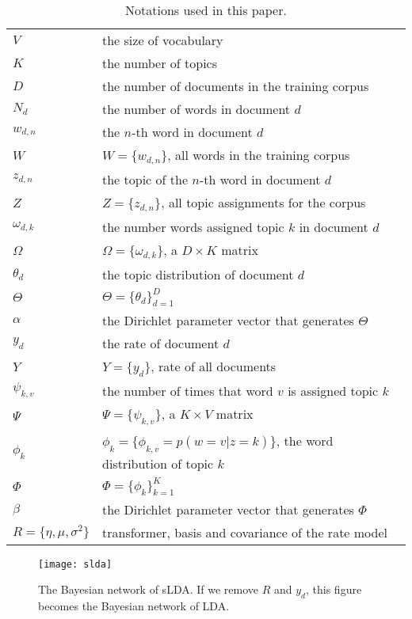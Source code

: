 \begin{table}[!h]
  \centering
  \begin{tabular}{ll}
    $V$ & the size of vocabulary \\
    $K$ & the number of topics \\
    $D$ & the number of documents in the training corpus \\
    $N_d$ & the number of words in document $d$ \\
    $w_{d,n}$ & the $n$-th word in document $d$ \\
    $W$ & $W=\{w_{d,n}\}$, all words in the training corpus \\
    $z_{d,n}$ & the topic of the $n$-th word in document $d$ \\
    $Z$ & $Z=\{z_{d,n}\}$, all topic assignments for the corpus \\
    $\omega_{d,k}$ & the number words assigned topic $k$ in document $d$ \\
    $\Omega$ & $\Omega=\{\omega_{d,k}\}$, a $D\times{}K$ matrix \\
    $\theta_d$ & the topic distribution of document $d$ \\
    $\Theta$ & $\Theta=\{\theta_d\}_{d=1}^D$ \\
    $\alpha$ & the Dirichlet parameter vector that generates $\Theta$ \\
    $y_d$ & the rate of document $d$ \\
    $Y$ & $Y=\{y_d\}$, rate of all documents \\
    $\psi_{k,v}$ & the number of times that word $v$ is assigned topic $k$ \\
    $\Psi$ & $\Psi=\{\psi_{k,v}\}$, a $K\times{}V$ matrix \\
    $\phi_k$ & $\phi_k=\{\phi_{k,v}=p(w=v|z=k)\}$, the word distribution of topic $k$ \\
    $\Phi$ & $\Phi=\{\phi_k\}_{k=1}^K$ \\
    $\beta$ & the Dirichlet parameter vector that generates $\Phi$ \\
    $R=\{\eta, \mu, \sigma^2\}$ & transformer, basis and covariance of the
    rate model \\
  \end{tabular}
  \caption{Notations used in this paper.}
  \label{tab:notations}
\end{table}

\begin{figure}[!t]
  \centering
  \texttt{[image: slda]}
  \caption{The Bayesian network of sLDA.  If we remove $R$ and $y_d$,
    this figure becomes the Bayesian network of LDA.}
  \label{fig:slda}
\end{figure}

